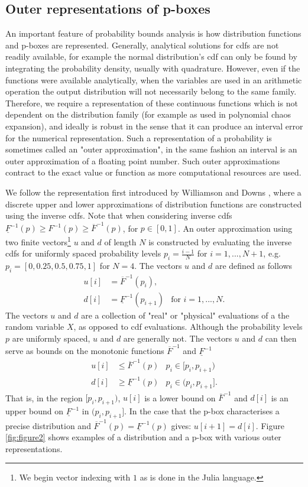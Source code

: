 \documentclass{juliacon}
\begin{document}
\subsection{Outer representations of p-boxes}
\label{sec:outer_approx}
An important feature of probability bounds analysis is how distribution functions and p-boxes are represented. Generally, analytical solutions for cdfs are not readily available, for example the normal distribution's cdf can only be found by integrating the probability density, usually with quadrature. However, even if the functions were available analytically, when the variables are used in an arithmetic operation the output distribution will not necessarily belong to the same family. Therefore, we require a representation of these continuous functions which is not dependent on the distribution family (for example as used in polynomial chaos expansion), and ideally is robust in the sense that it can produce an interval error for the numerical representation. Such a representation of a probability is sometimes called an "outer approximation", in the same fashion an interval is an outer approximation of a floating point number. Such outer approximations contract to the exact value or function as more computational resources are used.

We follow the representation first introduced by Williamson and Downs \cite{williamson1990probabilistic}, where a discrete upper and lower approximations of distribution functions are constructed using the inverse cdfs. Note that when considering inverse cdfs $\underline{F}^{-1}(p) \geq F^{-1}(p) \geq \overline{F}^{-1}(p)$, for $p \in [0,1]$. An outer approximation using two finite vectors\footnote{We begin vector indexing with $1$ as is done in the Julia language.} $u$ and $d$ of length $N$ is constructed by evaluating the inverse cdfs for uniformly spaced probability levels $p_{i} = \frac{i-1}{N}$ for $i = 1, ... , N+1$, e.g. $p_{i} = [0, 0.25, 0.5, 0.75, 1]$ for $N = 4$. The vectors $u$ and $d$ are defined as follows
\begin{align*}
  u[i] &= \overline{F}^{-1}(p_{i}), \\ 
  d[i] &= \underline{F}^{-1}(p_{i+1}) & \text{for } i = 1, ..., N .
\end{align*}
The vectors $u$ and $d$ are a collection of "real" or "physical" evaluations of a the random variable $X$, as opposed to cdf evaluations. Although the probability levels $p$ are uniformly spaced, $u$ and $d$ are generally not. The vectors $u$ and $d$ can then serve as bounds on the monotonic functions $\overline{F}^{-1}$ and $\underline{F}^{-1}$
\begin{align*}
  u[i] &\leq \overline{F}^{-1}(p) & p_{i} \in [p_{i}, p_{i+1} )\\ 
  d[i] &\geq \underline{F}^{-1}(p) & p_{i} \in (p_{i}, p_{i+1}].
\end{align*}
That is, in the region $[p_{i}, p_{i+1})$, $u[i]$ is a lower bound on $\overline{F}^{-1}$ and $d[i]$ is an upper bound on $\underline{F}^{-1}$ in $(p_{i}, p_{i+1}]$. In the case that the p-box characterises a precise distribution and $\overline{F}^{-1}(p) = \underline{F}^{-1}(p)$ gives:  $u[i+1] = d[i]$. Figure \ref{fig:figure2} shows examples of a distribution and a p-box with various outer representations.
\end{document}
